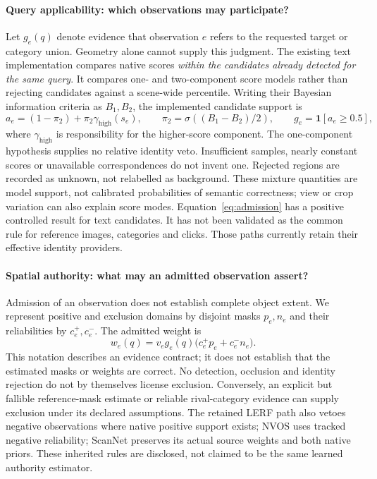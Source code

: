 \paragraph{Query applicability: which observations may participate?}
Let $g_e(q)$ denote evidence that observation $e$ refers to the requested target
or category union. Geometry alone cannot supply this judgment. The existing
text implementation compares native scores \emph{within the candidates
already detected for the same query}. It compares one- and two-component
score models rather than rejecting candidates against a scene-wide percentile.
Writing their Bayesian information criteria as $B_1,B_2$, the implemented
candidate support is
\begin{equation}
 a_e=(1-\pi_2)+\pi_2\gamma_{\mathrm{high}}(s_e),
 \qquad \pi_2=\sigma((B_1-B_2)/2),\qquad
 g_e=\mathbf 1[a_e\geq 0.5],
 \label{eq:admission}
\end{equation}
where $\gamma_{\mathrm{high}}$ is responsibility for the higher-score component.
The one-component hypothesis supplies no relative identity veto. Insufficient
samples, nearly constant scores or unavailable correspondences do not invent
one. Rejected regions are recorded as unknown, not relabelled as background.
These mixture quantities are model support, not calibrated probabilities of
semantic correctness; view or crop variation can also explain score modes.
Equation~\ref{eq:admission} has a positive controlled result for text candidates.
It has not been validated as the common rule for reference images, categories
and clicks. Those paths currently retain their effective identity providers.

\paragraph{Spatial authority: what may an admitted observation assert?}
Admission of an observation does not establish complete object extent. We
represent positive and exclusion domains by disjoint masks $p_e,n_e$ and their
reliabilities by $c_e^+,c_e^-$. The admitted weight is
\begin{equation}
 w_e(q)=v_e g_e(q)\big(c_e^+p_e+c_e^-n_e\big).
 \label{eq:authority}
\end{equation}
This notation describes an evidence contract; it does not establish that the
estimated masks or weights are correct. No detection, occlusion and identity
rejection do not by themselves license exclusion. Conversely, an explicit
but fallible reference-mask estimate or reliable rival-category evidence can
supply exclusion under its declared assumptions. The retained LERF path
also vetoes negative observations where native positive support exists;
NVOS uses tracked negative reliability; ScanNet preserves its actual source
weights and both native priors. These inherited rules are disclosed, not
claimed to be the same learned authority estimator.

